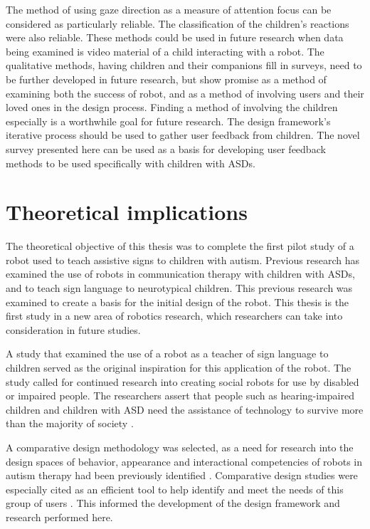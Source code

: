 The method of using gaze direction as a measure of attention focus can be considered as particularly reliable. The classification of the children's reactions were also reliable. These methods could be used in future research when data being examined is video material of a child interacting with a robot. The qualitative methods, having children and their companions fill in surveys, need to be further developed in future research, but show promise as a method of examining both the success of robot, and as a method of involving users and their loved ones in the design process. Finding a method of involving the children especially is a worthwhile goal for future research. The design framework's iterative process should be used to gather user feedback from children. The novel survey presented here can be used as a basis for developing user feedback methods to be used specifically with children with ASDs.


\section{Theoretical implications}

The theoretical objective of this thesis was to complete the first pilot study of a robot used to teach assistive signs to children with autism. Previous research has examined the use of robots in communication therapy with children with ASDs, and to teach sign language to neurotypical children. This previous research was examined to create a basis for the initial design of the robot. This thesis is the first study in a new area of robotics research, which researchers can take into consideration in future studies. 

A study that examined the use of a robot as a teacher of sign language to children served as the original inspiration for this application of the robot. The study called for continued research into creating social robots for use by disabled or impaired people. The researchers assert that people such as hearing-impaired children and children with ASD need the assistance of technology to survive more than the majority of society \cite{uluer2015new}.

A comparative design methodology was selected, as a need for research into the design spaces of behavior, appearance and interactional competencies of robots in autism therapy had been previously identified \cite{designSpaces, robins2006appearance}. Comparative design studies were especially cited as an efficient tool to help identify and meet the needs of this group of users \cite{robins2006appearance}. This informed the development of the design framework and research performed here.

